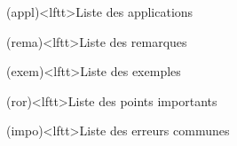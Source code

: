 \documentclass[../../main/main.tex]{subfiles}
\begin{document}
\begin{boxes}
	\begin{tcb}(appl)<lftt>{Liste des applications}
	\end{tcb}
	\begin{tcb}(rema)<lftt>{Liste des remarques}
	\end{tcb}
	\begin{tcb}(exem)<lftt>{Liste des exemples}
	\end{tcb}
	\begin{tcb}(ror)<lftt>{Liste des points importants}
	\end{tcb}
	\begin{tcb}(impo)<lftt>{Liste des erreurs communes}
	\end{tcb}
\end{boxes}
\vspace*{\fill}
\newpage
\end{document}
